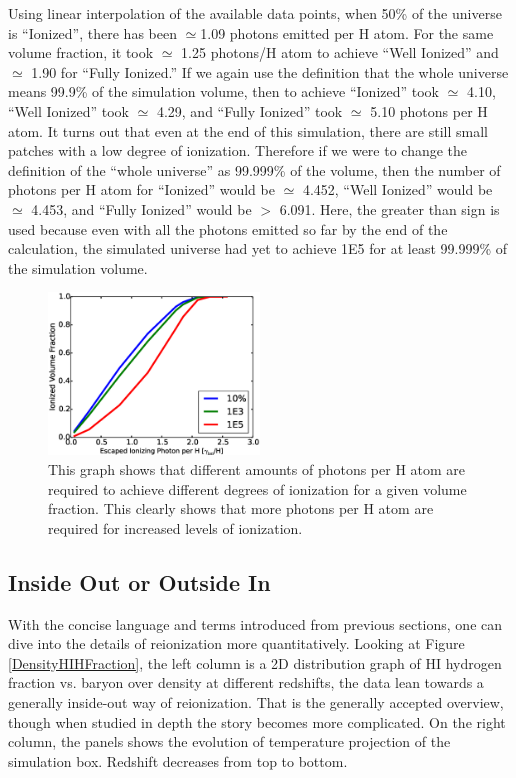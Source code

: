 \documentclass[letterpaper,10pt]{article}
\renewcommand{\(}{\left(}
\renewcommand{\)}{\right)}
\begin{document}
Using linear interpolation of the available data points, when 50\% of
the universe is ``Ionized'', there has been $\simeq$1.09 photons emitted
per H atom.  For the same volume fraction, it took $\simeq$ 1.25
photons/H atom to achieve ``Well Ionized'' and $\simeq$ 1.90 for
``Fully Ionized.''  If we again use the definition that the whole
universe means 99.9\% of the simulation volume, then to achieve
``Ionized'' took $\simeq$ 4.10, ``Well Ionized'' took $\simeq$ 4.29,
and ``Fully Ionized'' took $\simeq$ 5.10 photons per H atom.  It turns
out that even at the end of this simulation, there are still small
patches with a low degree of ionization.  Therefore if we were to
change the definition of the ``whole universe'' as 99.999\% of the
volume, then the number of photons per H atom for ``Ionized'' would be
$\simeq$ 4.452, ``Well Ionized'' would be $\simeq$ 4.453, and ``Fully
Ionized'' would be $>$ 6.091.  Here, the greater than sign is used
because even with all the photons emitted so far by the end of the
calculation, the simulated universe had yet to achieve 1E5 for at
least 99.999\% of the simulation volume.

\begin{figure}
  \includegraphics[width=0.5\textwidth]{thresh_photon_per_H.eps}
  \caption{\footnotesize This graph shows that different amounts of
    photons per H atom are required to achieve different degrees of
    ionization for a given volume fraction.  This clearly shows that
    more photons per H atom are required for increased levels of
    ionization.}
  \label{numPhoton_Ion}
\end{figure}

\subsection{Inside Out or Outside In}

With the concise language and terms introduced from previous sections,
one can dive into the details of reionization more quantitatively.
Looking at Figure \ref{DensityHIHFraction}, the left column is a 2D distribution graph 
of H{\footnotesize I} hydrogen fraction vs.  baryon over density
at different redshifts, the data lean towards a generally inside-out 
way of reionization. That is the generally
accepted overview, though when studied in depth the story
becomes more complicated.  On the right column, the panels shows the evolution
of temperature projection of the simulation box.  Redshift decreases from top to bottom.
\end{document}
